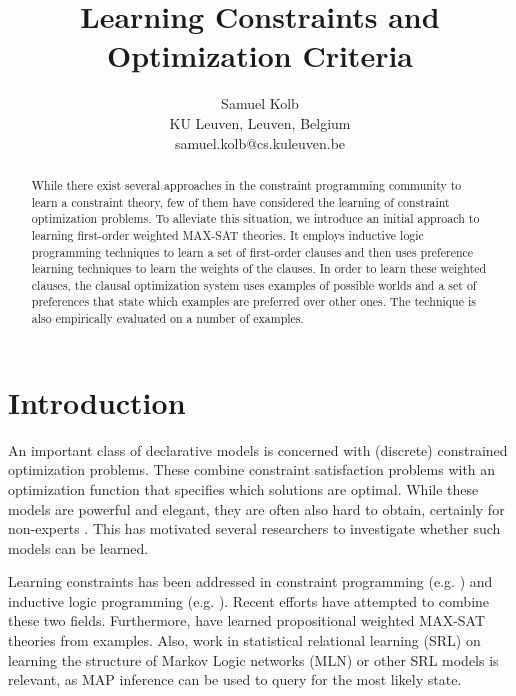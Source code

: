 \documentclass[letterpaper]{article}
\theoremstyle{definition}
\begin{document}
\title{Learning Constraints and Optimization Criteria}
\author{
  Samuel Kolb\\
  KU Leuven, Leuven, Belgium\\
  samuel.kolb@cs.kuleuven.be
}

\maketitle

\begin{abstract}
While there exist several approaches in the constraint programming community to learn a constraint theory, few of them have considered the learning of constraint optimization problems.
To alleviate this situation, we introduce an initial approach to learning first-order weighted MAX-SAT theories. 
It employs inductive logic programming techniques to learn a set of first-order clauses and then uses preference learning techniques to learn the weights of the clauses.
In order to learn these weighted clauses, the clausal optimization system uses examples of possible worlds and a set of preferences that state which examples are preferred over other ones.
The technique is also empirically evaluated on a number of examples.

\end{abstract}


\section{Introduction}
An important class of declarative models is concerned with (discrete) constrained optimization problems.
These combine constraint satisfaction problems with an optimization function that specifies which solutions are optimal.
While these models are powerful and elegant, they are often also hard to obtain, certainly for non-experts \cite{Wallace:PrinciplesCP}.
This has motivated several researchers to investigate whether such models can be learned. 

Learning constraints has been addressed in constraint programming (e.g. \cite{Beldiceanu:ModelSeeker,bessiere2013constraint}) and inductive logic programming (e.g. \cite{DeRaedt:ClausalDiscovery}).
Recent efforts \cite{Lallouet:LearningCP} have attempted to combine these two fields.
Furthermore, \cite{campigotto2011active} have learned propositional weighted MAX-SAT theories from examples.
Also, work in statistical relational learning (SRL) on learning the structure of Markov Logic networks (MLN) or other SRL models \cite{kok2005learning} is relevant, as MAP inference can be used to query for the most likely state. 
\end{document}
